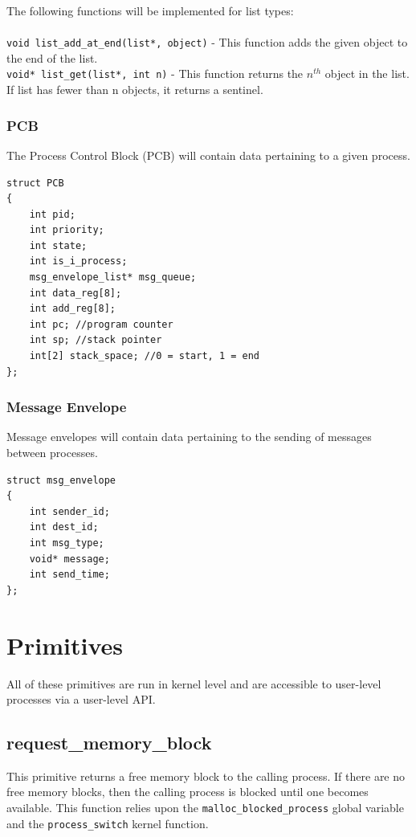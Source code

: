 \documentclass[titlepage]{article}
\begin{document}
The following functions will be implemented for list types:\\\\
\verb!void list_add_at_end(list*, object)! - This function adds the given object to
the end of the list.\\
\verb!void* list_get(list*, int n)! - This function returns the $n^{th}$ object in the
list.  If list has fewer than n objects, it returns a sentinel.

\subsubsection{PCB}
The Process Control Block (PCB) will contain data pertaining to a given process.
\begin{verbatim}
struct PCB
{
    int pid;
    int priority;
    int state;
    int is_i_process;
    msg_envelope_list* msg_queue;
    int data_reg[8];
    int add_reg[8];
    int pc; //program counter
    int sp; //stack pointer
    int[2] stack_space; //0 = start, 1 = end
};
\end{verbatim}

\subsubsection{Message Envelope}
Message envelopes will contain data pertaining to the sending of messages between processes.

\begin{verbatim}
struct msg_envelope
{
    int sender_id;
    int dest_id;
    int msg_type;
    void* message;
    int send_time;
};
\end{verbatim}

\section{Primitives}
All of these primitives are run in kernel level and are accessible to user-level
processes via a user-level API.

\subsection{request\_memory\_block}
This primitive returns a free memory block to the calling process.  If there are
no free memory blocks, then the calling process is blocked until one becomes
available.  This function relies upon the \verb!malloc_blocked_process! global
variable and the \verb!process_switch! kernel function.
\end{document}
